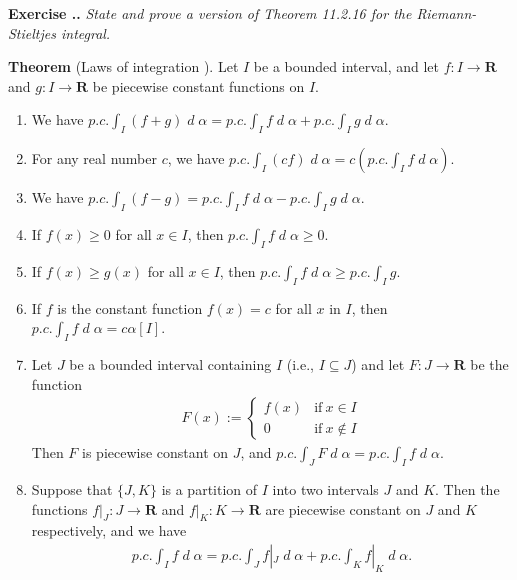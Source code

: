 \documentclass{book}
\DeclareMathOperator{\dd}{\mathit{d}}
\newcommand{\titl}[1]{\noindent\textbf{#1}}
\newcounter{Exercise}[section]
\renewcommand{\theExercise}{\thesection.\arabic{Exercise}.}
\newcommand{\new}{\vspace{1.5em}\noindent\textbf{{Exercise \stepcounter{Exercise}\textbf{\theExercise}}} }
\begin{document}
\new\emph{State and prove a version of Theorem 11.2.16 for the Riemann-Stieltjes integral.}

\begin{framed}
    \titl{Theorem} (Laws of integration ). Let $I$ be a bounded interval, and let $f : I \to \mathbf{R}$ and $g : I \to \mathbf{R}$ be piecewise constant functions on $I$.
    \begin{enumerate}
        \item We have $p.c. \int_{I} (f + g) \dd\alpha = p.c. \int_{I} f \dd\alpha + p.c. \int_{I} g \dd\alpha$.
        \item For any real number $c$, we have $p.c. \int_{I} (cf) \dd\alpha = c (p.c. \int_{I} f \dd\alpha)$.
        \item We have $p.c. \int_{I} (f - g) = p.c. \int_{I} f \dd\alpha - p.c. \int_{I} g \dd\alpha$.
        \item If $f(x) \geq 0$ for all $x \in I$, then $p.c. \int_{I} f \dd\alpha \geq 0$.
        \item If $f(x) \geq g(x)$ for all $x \in I$, then $p.c. \int_{I} f \dd\alpha \geq p.c. \int_{I} g$.
        \item If $f$ is the constant function $f(x) = c$ for all $x$ in $I$, then $p.c. \int_{I} f \dd\alpha = c\alpha[I]$.
        \item Let $J$ be a bounded interval containing $I$ (i.e., $I \subseteq J$) and let $F : J \to \mathbf{R}$ be the function
            \begin{align*}
                F(x) := \left\{\begin{array}{ll}
                    f(x)&\text{if}\ x \in I\\
                    0   &\text{if}\ x \notin I
                \end{array}\right.
            \end{align*}
        Then $F$ is piecewise constant on $J$, and $p.c. \int_{J} F \dd\alpha = p.c. \int_{I} f \dd\alpha$.
        \item Suppose that $\{J, K\}$ is a partition of $I$ into two intervals $J$ and $K$. Then the functions $f|_J : J \to \mathbf{R}$ and $f|_K : K \to \mathbf{R}$ are piecewise constant on $J$ and $K$ respectively, and we have
            \begin{align*}
                p.c. \int_{I} f \dd\alpha = p.c. \int_{J} f|_J \dd\alpha + p.c. \int_{K} f|_K \dd\alpha.
            \end{align*}
    \end{enumerate}
    \end{framed}
    
\end{document}
